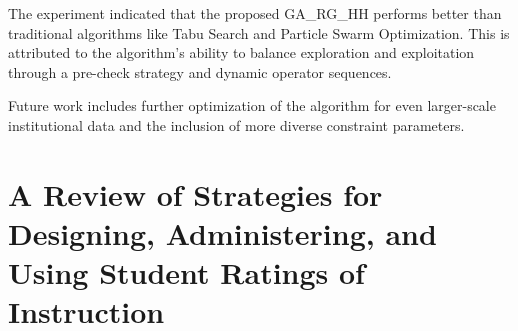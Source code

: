The experiment indicated that the proposed GA\_RG\_HH performs better than traditional algorithms like Tabu Search and Particle Swarm Optimization. This is attributed to the algorithm's ability to balance exploration and exploitation through a pre-check strategy and dynamic operator sequences.

Future work includes further optimization of the algorithm for even larger-scale institutional data and the inclusion of more diverse constraint parameters.

\section{A Review of Strategies for Designing, Administering, and Using Student Ratings of Instruction \cite{paper_14}}

